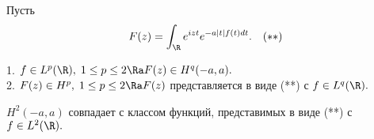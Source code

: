 \documentclass{article}
\begin{document}
Пусть
$$F(z)=\int_{\R }e^{izt}e^{-a|t|f(t)dt}.\quad(**)$$

\begin{theorem}
1. $f\in L^p(\R ),\;1\le p\le2\Ra F(z)\in H^q(-a,a).$\\\hangindent=2.5cm 2. $F(z)\in
H^p,\;1\le p\le2\Ra F(z)$ представляется в виде (**) с $f\in L^q(\R ).$
\end{theorem}

\begin{theorem}
$H^2(-a,a)$ совпадает с классом функций, представимых в виде (**) с $f\in L^2(\R).$
\end{theorem}
\end{document}
